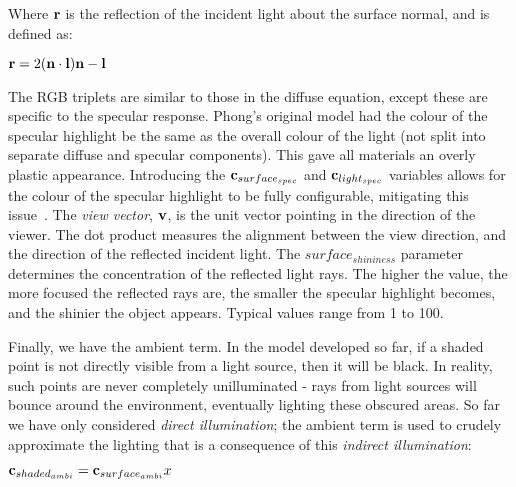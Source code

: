 Where \begin{math}\mathbf{r}\end{math} is the reflection of the incident light about the surface normal, and is defined as:

\begin{center}
	\begin{math}\mathbf{r} = 2(\mathbf{n}\cdot\mathbf{l})\mathbf{n} - \mathbf{l}\end{math}	
\end{center}

The RGB triplets are similar to those in the diffuse equation, except these are specific to the specular response. Phong's original model had the colour of the specular highlight be the same as the overall colour of the light (not split into separate diffuse and specular components). This gave all materials an overly plastic appearance. Introducing the \begin{math}\mathbf{c}_{surface_{spec}}\end{math} and \begin{math}\mathbf{c}_{light_{spec}}\end{math} variables allows for the colour of the specular highlight to be fully configurable, mitigating this issue~\cite{LightingModelForComputerAnimators}. The \textit{view vector}, \begin{math}\mathbf{v}\end{math}, is the unit vector pointing in the direction of the viewer. The dot product measures the alignment between the view direction, and the direction of the reflected incident light. The \begin{math}surface_{shininess}\end{math} parameter determines the concentration of the reflected light rays. The higher the value, the more focused the reflected rays are, the smaller the specular highlight becomes, and the shinier the object appears. Typical values range from 1 to 100.

Finally, we have the ambient term. In the model developed so far, if a shaded point is not directly visible from a light source, then it will be black. In reality, such points are never completely unilluminated - rays from light sources will bounce around the environment, eventually lighting these obscured areas. So far we have only considered \textit{direct illumination}; the ambient term is used to crudely approximate the lighting that is a consequence of this \textit{indirect illumination}:

\begin{center}
	\begin{math}\mathbf{c}_{shaded_{ambi}} = \mathbf{c}_{surface_{ambi}}x\end{math}
\end{center}

